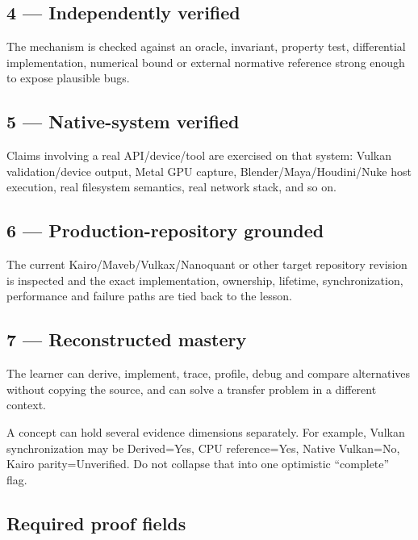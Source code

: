 \subsection{4 --- Independently verified}\label{appendix-2a2e5bd7143a-independently-verified}

The mechanism is checked against an oracle, invariant, property test, differential implementation, numerical bound or external normative reference strong enough to expose plausible bugs.

\subsection{5 --- Native-system verified}\label{appendix-2a2e5bd7143a-native-system-verified}

Claims involving a real API/device/tool are exercised on that system: Vulkan validation/device output, Metal GPU capture, Blender/Maya/Houdini/Nuke host execution, real filesystem semantics, real network stack, and so on.

\subsection{6 --- Production-repository grounded}\label{appendix-2a2e5bd7143a-production-repository-grounded}

The current Kairo/Maveb/Vulkax/Nanoquant or other target repository revision is inspected and the exact implementation, ownership, lifetime, synchronization, performance and failure paths are tied back to the lesson.

\subsection{7 --- Reconstructed mastery}\label{appendix-2a2e5bd7143a-reconstructed-mastery}

The learner can derive, implement, trace, profile, debug and compare alternatives without copying the source, and can solve a transfer problem in a different context.

A concept can hold several evidence dimensions separately. For example, Vulkan synchronization may be Derived=Yes, CPU reference=Yes, Native Vulkan=No, Kairo parity=Unverified. Do not collapse that into one optimistic ``complete'' flag.

\subsection{Required proof fields}\label{appendix-2a2e5bd7143a-required-proof-fields}

